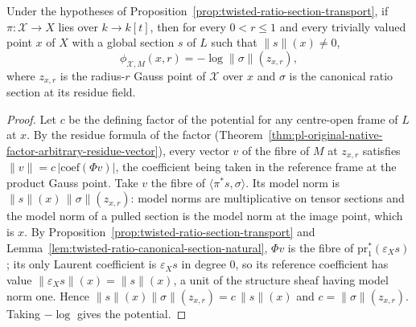 \begin{theorem}
\label{thm:twisted-ratio-model-potential}
\leanok
Under the hypotheses of Proposition~\ref{prop:twisted-ratio-section-transport},
if $\pi\colon\mathcal X\to X$ lies over $k\to k[t]$, then for every
$0<r\le1$ and every trivially valued point $x$ of $X$ with a global section $s$
of $L$ such that $\|s\|(x)\neq0$,
\[
  \phi_{\mathcal X,M}(x,r)=-\log\|\sigma\|(z_{x,r}),
\]
where $z_{x,r}$ is the radius-$r$ Gauss point of $\mathcal X$ over $x$ and
$\sigma$ is the canonical ratio section at its residue field.
\end{theorem}
\begin{proof}
Let $c$ be the defining factor of the potential for any centre-open frame of
$L$ at $x$.  By the residue formula of the factor
(Theorem~\ref{thm:pl-original-native-factor-arbitrary-residue-vector}), every
vector $v$ of the fibre of $M$ at $z_{x,r}$ satisfies
$\|v\|=c\,|\mathrm{coef}(\Phi v)|$, the coefficient being taken in the
reference frame at the product Gauss point.  Take $v$ the fibre of
$\langle\pi^*s,\sigma\rangle$.  Its model norm is
$\|s\|(x)\,\|\sigma\|(z_{x,r})$: model norms are multiplicative on tensor
sections and the model norm of a pulled section is the model norm at the
image point, which is $x$.  By
Proposition~\ref{prop:twisted-ratio-section-transport} and
Lemma~\ref{lem:twisted-ratio-canonical-section-natural}, $\Phi v$ is the fibre
of $\mathrm{pr}_1^*(\varepsilon_X s)$; its only Laurent coefficient is
$\varepsilon_X s$ in degree $0$, so its reference coefficient has value
$\|\varepsilon_Xs\|(x)=\|s\|(x)$, a unit of the structure sheaf having model
norm one.  Hence $\|s\|(x)\|\sigma\|(z_{x,r})=c\,\|s\|(x)$ and
$c=\|\sigma\|(z_{x,r})$.  Taking $-\log$ gives the potential.
\end{proof}
